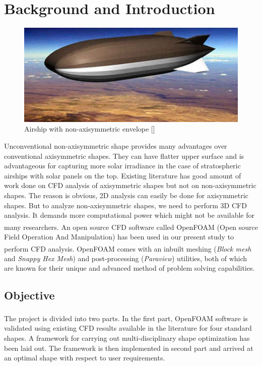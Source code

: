 
\newcommand{\etas}{\ensuremath{\eta_{\mathrm{s}}}}


\chapter{Background and Introduction}

\begin{figure}[H]
	\centering
	\includegraphics{intro/Stratellite.jpg}
	\caption{Airship with non-axisymmetric envelope []}
	\label{Stratellite} %
\end{figure}

Unconventional non-axisymmetric shape provides many advantages over conventional axisymmetric shapes. They can have flatter upper surface and is advantageous for capturing more solar irradiance in the case of stratospheric airships with solar panels on the top. Existing literature has good amount of work done on CFD analysis of axisymmetric shapes but not on non-axisymmetric shapes. The reason is obvious, 2D analysis can easily be done for axisymmetric shapes. But to analyze non-axisymmetric shapes, we need to perform 3D CFD analysis. It demands more computational power which might not be available for many researchers. An open source CFD software called OpenFOAM\textsuperscript{\textregistered} (Open source Field Operation And Manipulation) has been used in our present study to perform CFD analysis. OpenFOAM\textsuperscript{\textregistered} comes with an inbuilt meshing (\textit{Block mesh} and \textit{Snappy Hex Mesh}) and post-processing (\textit{Paraview}) utilities, both of which are known for their unique and advanced method of problem solving capabilities. \\

\section{Objective}
The project is divided into two parts. In the first part, OpenFOAM\textsuperscript{\textregistered} software is validated using existing CFD results available in the literature for four standard shapes. A framework for carrying out multi-disciplinary shape  optimization has been laid out. The framework is then implemented in second part and arrived at an optimal shape with respect to user requirements.
